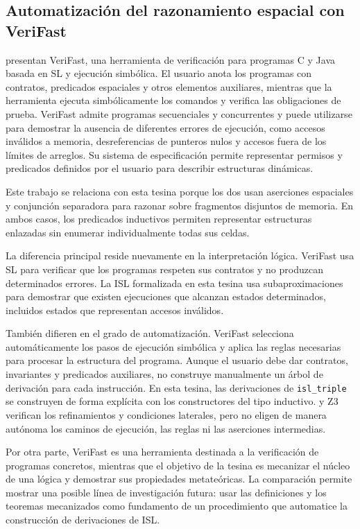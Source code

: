\documentclass[a4paper,	11pt]{report}
\begin{document}
\subsection*{Automatización del razonamiento espacial con VeriFast}
\citet{verifast} presentan VeriFast,
una herramienta de verificación para programas C y Java basada en SL y ejecución simbólica.
El usuario anota los programas con contratos,
predicados espaciales y otros elementos auxiliares,
mientras que la herramienta ejecuta simbólicamente los comandos y verifica las obligaciones de prueba.
VeriFast admite programas secuenciales y concurrentes y puede utilizarse para demostrar la ausencia de diferentes errores de ejecución,
como accesos inválidos a memoria,
desreferencias de punteros nulos y accesos fuera de los límites de arreglos.
Su sistema de especificación permite representar permisos y predicados definidos por el usuario para describir estructuras dinámicas.

Este trabajo se relaciona con esta tesina porque los dos usan aserciones espaciales y conjunción separadora para razonar sobre fragmentos disjuntos de memoria.
En ambos casos,
los predicados inductivos permiten representar estructuras enlazadas sin enumerar individualmente todas sus celdas.

La diferencia principal reside nuevamente en la interpretación lógica.
VeriFast usa SL para verificar que los programas respeten sus contratos y no produzcan determinados errores.
La ISL formalizada en esta tesina usa subaproximaciones para demostrar que existen ejecuciones que alcanzan estados determinados,
incluidos estados que representan accesos inválidos.

También difieren en el grado de automatización.
VeriFast selecciona automáticamente los pasos de ejecución simbólica y aplica las reglas necesarias para procesar la estructura del programa.
Aunque el usuario debe dar contratos,
invariantes y predicados auxiliares,
no construye manualmente un árbol de derivación para cada instrucción.
En esta tesina,
las derivaciones de \lstinline|isl_triple| se construyen de forma explícita con los constructores del tipo inductivo.
\fstar{} y Z3 verifican los refinamientos y condiciones laterales,
pero no eligen de manera autónoma los caminos de ejecución,
las reglas ni las aserciones intermedias.

Por otra parte,
VeriFast es una herramienta destinada a la verificación de programas concretos,
mientras que el objetivo de la tesina es mecanizar el núcleo de una lógica y demostrar sus propiedades metateóricas.
La comparación permite mostrar una posible línea de investigación futura:
usar las definiciones y los teoremas mecanizados como fundamento de un procedimiento que automatice la construcción de derivaciones de ISL.
\end{document}
